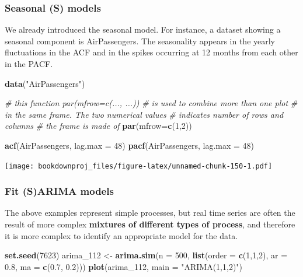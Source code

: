 \documentclass[
]{article}
\newenvironment{Shaded}{\begin{snugshade}}{\end{snugshade}}
\newcommand{\CommentTok}[1]{\textcolor[rgb]{0.56,0.35,0.01}{\textit{#1}}}
\newcommand{\DataTypeTok}[1]{\textcolor[rgb]{0.13,0.29,0.53}{#1}}
\newcommand{\DecValTok}[1]{\textcolor[rgb]{0.00,0.00,0.81}{#1}}
\newcommand{\FloatTok}[1]{\textcolor[rgb]{0.00,0.00,0.81}{#1}}
\newcommand{\KeywordTok}[1]{\textcolor[rgb]{0.13,0.29,0.53}{\textbf{#1}}}
\newcommand{\NormalTok}[1]{#1}
\newcommand{\StringTok}[1]{\textcolor[rgb]{0.31,0.60,0.02}{#1}}
\begin{document}
\hypertarget{seasonal-s-models}{%
\subsubsection{Seasonal (S) models}\label{seasonal-s-models}}

We already introduced the seasonal model. For instance, a dataset showing a seasonal component is AirPassengers. The seasonality appears in the yearly fluctuations in the ACF and in the spikes occurring at 12 months from each other in the PACF.

\begin{Shaded}
\begin{Highlighting}[]
\KeywordTok{data}\NormalTok{(}\StringTok{"AirPassengers"}\NormalTok{)}

\CommentTok{# this function par(mfrow=c(..., ...))}
\CommentTok{# is used to combine more than one plot}
\CommentTok{# in the same frame. The two numerical values}
\CommentTok{# indicates number of rows and columns}
\CommentTok{# the frame is made of}
\KeywordTok{par}\NormalTok{(}\DataTypeTok{mfrow=}\KeywordTok{c}\NormalTok{(}\DecValTok{1}\NormalTok{,}\DecValTok{2}\NormalTok{))}

\KeywordTok{acf}\NormalTok{(AirPassengers, }\DataTypeTok{lag.max =} \DecValTok{48}\NormalTok{)}
\KeywordTok{pacf}\NormalTok{(AirPassengers, }\DataTypeTok{lag.max =} \DecValTok{48}\NormalTok{)}
\end{Highlighting}
\end{Shaded}

\texttt{[image: bookdownproj\_files/figure-latex/unnamed-chunk-150-1.pdf]}

\hypertarget{fit-sarima-models}{%
\subsubsection{Fit (S)ARIMA models}\label{fit-sarima-models}}

The above examples represent simple processes, but real time series are often the result of more complex \textbf{mixtures of different types of process}, and therefore it is more complex to identify an appropriate model for the data.

\begin{Shaded}
\begin{Highlighting}[]
\KeywordTok{set.seed}\NormalTok{(}\DecValTok{7623}\NormalTok{)}
\NormalTok{arima_}\DecValTok{112}\NormalTok{ <-}\StringTok{ }\KeywordTok{arima.sim}\NormalTok{(}\DataTypeTok{n =} \DecValTok{500}\NormalTok{, }\KeywordTok{list}\NormalTok{(}\DataTypeTok{order =} \KeywordTok{c}\NormalTok{(}\DecValTok{1}\NormalTok{,}\DecValTok{1}\NormalTok{,}\DecValTok{2}\NormalTok{), }\DataTypeTok{ar =} \FloatTok{0.8}\NormalTok{, }\DataTypeTok{ma =} \KeywordTok{c}\NormalTok{(}\FloatTok{0.7}\NormalTok{, }\FloatTok{0.2}\NormalTok{)))}
\KeywordTok{plot}\NormalTok{(arima_}\DecValTok{112}\NormalTok{, }\DataTypeTok{main =} \StringTok{"ARIMA(1,1,2)"}\NormalTok{)}
\end{Highlighting}
\end{Shaded}
\end{document}
